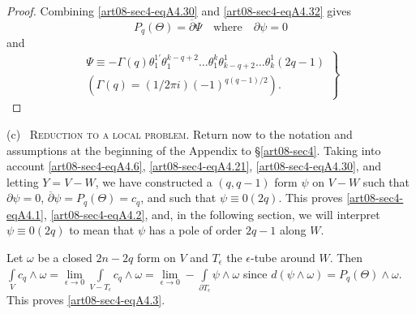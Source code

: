 \begin{proof}
Combining \eqref{art08-sec4-eqA4.30} and \eqref{art08-sec4-eqA4.32} gives
\begin{equation*}
P_{q}(\Theta)=\overline{\partial}\Psi\quad\text{where}\quad \partial \psi=0\tag{A4.33}\label{art08-sec4-eqA4.33}
\end{equation*}
and 
\begin{equation*}
\left.
\begin{array}{c}
\Psi\equiv -\Gamma(q)\theta^{1'}_{1}\theta^{k-q+2}_{1}\ldots\theta^{k}_{1}\theta^{1}_{k-q+2}\ldots\theta^{1}_{k}(2q-1)\\[3pt]
(\Gamma(q)=(1/2\pi i)(-1)^{q(q-1)/2}).
\end{array}\right\}\tag{A4.34}\label{art08-sec4-eqA4.34}
\end{equation*}
\end{proof}

(c)~ \textsc{Reduction to a local problem.} Return now to the notation and assumptions at the beginning of the Appendix to \S\ref{art08-sec4}. Taking into account \eqref{art08-sec4-eqA4.6}, \eqref{art08-sec4-eqA4.21}, \eqref{art08-sec4-eqA4.30}, and letting $Y=V-W$, we have constructed a $(q,q-1)$ form $\psi$ on $V-W$ such that $\partial\psi=0$, $\overline{\partial}\psi=P_{q}(\Theta)=c_{q}$, and such that $\psi\equiv 0(2q)$. This proves \eqref{art08-sec4-eqA4.1}, \eqref{art08-sec4-eqA4.2}, and, in the following section, we will interpret $\psi\equiv 0(2q)$ to mean that $\psi$ has a pole of order $2q-1$ along $W$.

Let $\omega$ be a closed $2n-2q$ form on $V$ and $T_{\epsilon}$ the $\epsilon$-tube around $W$. Then $\int\limits_{V}c_{q}\wedge\omega =\lim\limits_{\epsilon\to 0}\int\limits_{V-T_{\epsilon}}c_{q}\wedge \omega=\lim\limits_{\epsilon\to 0}-\int\limits_{\partial T_{\epsilon}}\psi\wedge \omega$ since $d(\psi\wedge \omega)=P_{q}(\Theta)\wedge \omega$. This proves \eqref{art08-sec4-eqA4.3}.

